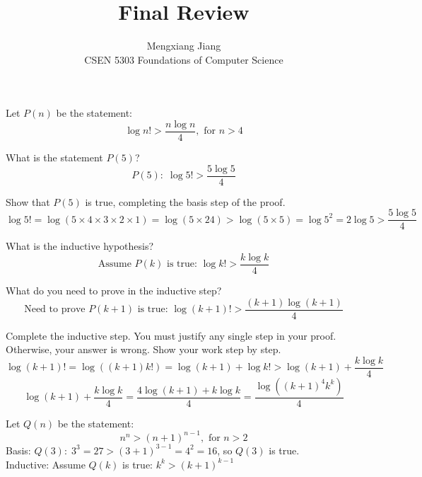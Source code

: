 \documentclass[12pt]{article}
\newenvironment{lemma}[2][Lemma]{\begin{trivlist}
\item[\hskip \labelsep {\bfseries #1}\hskip \labelsep {\bfseries #2.}]}{\end{trivlist}}
\newenvironment{problem}[2][Problem]{\begin{trivlist}
\item[\hskip \labelsep {\bfseries #1}\hskip \labelsep {\bfseries #2.}]}{\end{trivlist}}
\begin{document}
 
 
\title{Final Review}%
\author{Mengxiang Jiang\\ %
CSEN 5303 Foundations of Computer Science} %
 
\maketitle

\begin{problem}{6}
    Let $P(n)$ be the statement:
    $$\log{n!} > \frac{n\log{n}}{4},\text{ for $n > 4$}$$
    \begin{enumerate}
        \item What is the statement $P(5)$?\\
        $$P(5):\; \log{5!} > \frac{5\log{5}}{4}$$
        \item Show that $P(5)$ is true, completing the basis step of the proof.\\
        $$\log{5!} = \log(5\times4\times3\times2\times1) = \log(5\times24) > \log(5\times5) = \log5^2 = 2\log5 > \frac{5\log5}{4}$$
        \item What is the inductive hypothesis?\\
        $$\text{Assume $P(k)$ is true: }\log k! > \frac{k\log k}{4}$$
        \item What do you need to prove in the inductive step?\\
        $$\text{Need to prove $P(k+1)$ is true: }\log(k+1)! > \frac{(k+1)\log(k+1)}{4}$$
        \item Complete the inductive step. You must justify any single step in your proof. Otherwise,
        your answer is wrong. Show your work step by step.\\
        $$\log(k+1)! = \log((k+1)k!) = \log(k+1) + \log k! > \log(k+1) + \frac{k\log k}{4}$$
        $$\log(k+1) + \frac{k\log k}{4} = \frac{4\log(k+1) + k\log k}{4} = \frac{\log((k+1)^4k^k)}{4}$$
        \begin{lemma}{Q}
            Let $Q(n)$ be the statement:\\
            $$n^n > (n+1)^{n-1},\text{ for $n > 2$}$$
            Basis: $Q(3):\; 3^3 = 27 > (3+1)^{3-1} = 4^2 = 16$, so $Q(3)$ is true.\\
            Inductive: Assume $Q(k)$ is true: $k^k > (k+1)^{k-1}$\\

\end{lemma}
\end{enumerate}
\end{problem}
\end{document}
